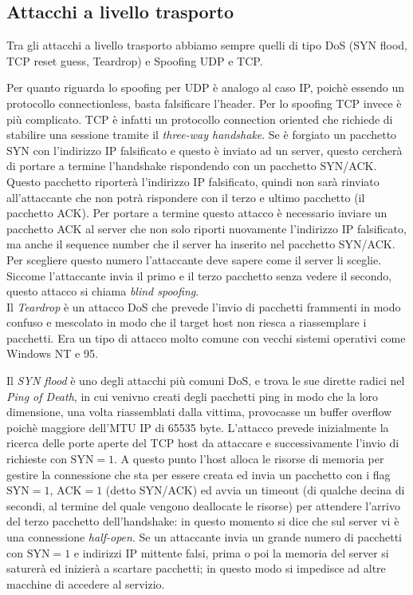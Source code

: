 \subsection{Attacchi a livello trasporto}
Tra gli attacchi a livello trasporto abbiamo sempre quelli di tipo DoS (SYN flood, TCP reset guess, Teardrop) e Spoofing UDP e TCP.

Per quanto riguarda lo spoofing per UDP è analogo al caso IP, poichè essendo un protocollo connectionless, basta falsificare l'header. Per lo spoofing TCP invece è più complicato. TCP è infatti un protocollo connection oriented che richiede di stabilire una sessione tramite il \textit{three-way handshake}. Se è forgiato un pacchetto SYN con l'indirizzo IP falsificato e questo è inviato ad un server, questo cercherà di portare a termine l'handshake rispondendo con un pacchetto SYN/ACK. Questo pacchetto riporterà l'indirizzo IP falsificato, quindi non sarà rinviato all'attaccante che non potrà rispondere con il terzo e ultimo pacchetto (il pacchetto ACK). Per portare a termine questo attacco è necessario inviare un pacchetto ACK al server che non solo riporti nuovamente l'indirizzo IP falsificato, ma anche il sequence number che il server ha inserito nel pacchetto SYN/ACK. Per scegliere questo numero l'attaccante deve sapere come il server li sceglie. Siccome l'attaccante invia il primo e il terzo pacchetto senza vedere il secondo, questo attacco si chiama \textit{blind spoofing}.\\

Il \textit{Teardrop} è un attacco DoS che prevede l'invio di pacchetti frammenti in modo confuso e mescolato in modo che il target host non riesca a riassemplare i pacchetti. Era un tipo di attacco molto comune con vecchi sistemi operativi come Windows NT e 95. 

Il \textit{SYN flood} è uno degli attacchi più comuni DoS, e trova le sue dirette radici nel \textit{Ping of Death}, in cui venivno creati degli pacchetti ping in modo che la loro dimensione, una volta riassemblati dalla vittima, provocasse un buffer overflow poichè maggiore dell'MTU IP di 65535 byte. L'attacco prevede inizialmente la ricerca delle porte aperte del TCP host da attaccare e successivamente l'invio di richieste con $\text{SYN}=1$. A questo punto l'host alloca le risorse di memoria per gestire la connessione che sta per essere creata ed invia un pacchetto con i flag $\text{SYN}=1$, $\text{ACK}=1$ (detto SYN/ACK) ed avvia un timeout (di qualche decina di secondi, al termine del quale vengono deallocate le risorse) per attendere l'arrivo del terzo pacchetto dell'handshake: in questo momento si dice che sul server vi è una connessione \textit{half-open}. Se un attaccante invia un grande numero di pacchetti con $\text{SYN}=1$ e indirizzi IP mittente falsi, prima o poi la memoria del server si saturerà ed inizierà a scartare pacchetti; in questo modo si impedisce ad altre macchine di accedere al servizio.\\

